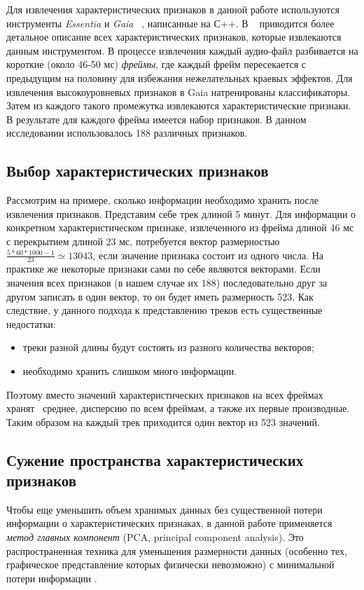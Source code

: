 Для извлечения характеристических признаков в данной работе используются инструменты \emph{Essentia} и \emph{Gaia} ~\cite{essentia}, написанные на С++. 
В ~\cite{essentia} приводится более детальное описание всех характеристических признаков, которые извлекаются данным инструментом. 
В процессе извлечения каждый аудио-файл разбивается на короткие (около 46-50 мс) \emph{фреймы}, где каждый фрейм пересекается с предыдущим 
на половину для избежания нежелательных краевых эффектов. Для извлечения высокоуровневых признаков в Gaia натренированы классификаторы.
Затем из каждого такого промежутка извлекаются характеристические признаки. В результате для каждого фрейма имеется набор признаков.
В данном исследовании использовалось 188 различных признаков.

\subsection{Выбор характеристических признаков}

Рассмотрим на примере, сколько информации необходимо хранить после извлечения признаков.
Представим себе трек длиной 5 минут. Для информации о конкретном характеристическом признаке, извлеченного из фрейма длиной 46 мс с перекрытием длиной
23 мс, потребуется вектор размерностью $\frac{5 * 60 * 1000 - 1}{23} \simeq 13043$, если значение признака состоит из одного числа. На практике
же некоторые признаки сами по себе являются векторами. Если значения всех признаков (в нашем случае их 188) последовательно друг за другом 
записать в один вектор, то он будет иметь размерность 523.
Как следствие, у данного подхода к представлению треков есть существенные недостатки:
\begin{itemize}
 \item треки разной длины будут состоять из разного количества векторов;
 \item необходимо хранить слишком много информации.
\end{itemize}
Поэтому вместо значений характеристических признаков на всех фреймах хранят~\cite{msordo_thesis, essentia} среднее, дисперсию по всем фреймам, а также их первые производные.
Таким образом на каждый трек приходится один вектор из 523 значений.

\subsection{Сужение пространства характеристических признаков}

Чтобы еще уменьшить объем хранимых данных без существенной потери информации о характеристических признаках, в данной работе применяется \emph{метод главных компонент} (PCA, principal component analysis).
Это распространенная техника для уменьшения размерности данных (особенно тех, графическое представление которых физически невозможно) с минимальной потери информации \cite{msordo_thesis, pca}. 

